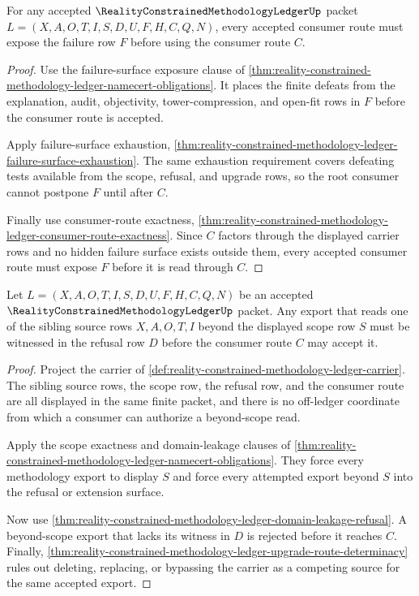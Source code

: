 \begin{theorem}
\label{thm:reality-constrained-methodology-ledger-root-failure-consumer-exhaustion}
For any accepted $\RealityConstrainedMethodologyLedgerUp$ packet $L=(X,A,O,T,I,S,D,U,F,H,C,Q,N)$, every accepted consumer route must expose the failure row $F$ before using the consumer route $C$.
\end{theorem}
\begin{proof}
Use the failure-surface exposure clause of \autoref{thm:reality-constrained-methodology-ledger-namecert-obligations}. It places the finite defeats from the explanation, audit, objectivity, tower-compression, and open-fit rows in $F$ before the consumer route is accepted.

Apply failure-surface exhaustion, \autoref{thm:reality-constrained-methodology-ledger-failure-surface-exhaustion}. The same exhaustion requirement covers defeating tests available from the scope, refusal, and upgrade rows, so the root consumer cannot postpone $F$ until after $C$.

Finally use consumer-route exactness, \autoref{thm:reality-constrained-methodology-ledger-consumer-route-exactness}. Since $C$ factors through the displayed carrier rows and no hidden failure surface exists outside them, every accepted consumer route must expose $F$ before it is read through $C$.
\end{proof}

\begin{theorem}
\label{thm:reality-constrained-methodology-ledger-source-refusal-boundary}
Let $L=(X,A,O,T,I,S,D,U,F,H,C,Q,N)$ be an accepted $\RealityConstrainedMethodologyLedgerUp$ packet. Any export that reads one of the sibling source rows $X,A,O,T,I$ beyond the displayed scope row $S$ must be witnessed in the refusal row $D$ before the consumer route $C$ may accept it.
\end{theorem}
\begin{proof}
Project the carrier of \autoref{def:reality-constrained-methodology-ledger-carrier}. The sibling source rows, the scope row, the refusal row, and the consumer route are all displayed in the same finite packet, and there is no off-ledger coordinate from which a consumer can authorize a beyond-scope read.

Apply the scope exactness and domain-leakage clauses of \autoref{thm:reality-constrained-methodology-ledger-namecert-obligations}. They force every methodology export to display $S$ and force every attempted export beyond $S$ into the refusal or extension surface.

Now use \autoref{thm:reality-constrained-methodology-ledger-domain-leakage-refusal}. A beyond-scope export that lacks its witness in $D$ is rejected before it reaches $C$. Finally, \autoref{thm:reality-constrained-methodology-ledger-upgrade-route-determinacy} rules out deleting, replacing, or bypassing the carrier as a competing source for the same accepted export.
\end{proof}

